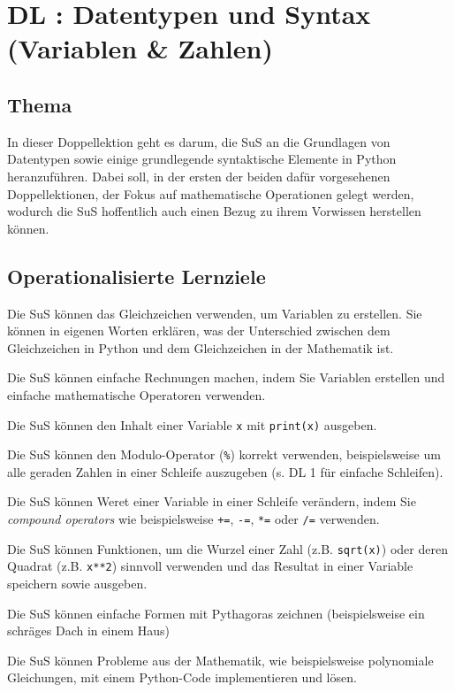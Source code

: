\section{DL \themycounter: Datentypen und Syntax (Variablen \& Zahlen)}
\begin{myExBox}[title=DL \themycounter]
\subsection*{Thema}
In dieser Doppellektion geht es darum, die SuS an die Grundlagen von Datentypen sowie einige grundlegende syntaktische Elemente in Python heranzuführen. Dabei soll, in der ersten der beiden dafür vorgesehenen Doppellektionen, der Fokus auf mathematische Operationen gelegt werden, wodurch die SuS hoffentlich auch einen Bezug zu ihrem Vorwissen herstellen können.

\subsection*{Operationalisierte Lernziele}
\begin{todolist}
    \item Die SuS können das Gleichzeichen verwenden, um Variablen zu erstellen. Sie können in eigenen Worten erklären, was der Unterschied zwischen dem Gleichzeichen in Python und dem Gleichzeichen in der Mathematik ist.
    \item Die SuS können einfache Rechnungen machen, indem Sie Variablen erstellen und einfache mathematische Operatoren verwenden.
    \item Die SuS können den Inhalt einer Variable \lstinline|x| mit \lstinline|print(x)| ausgeben.
    \item Die SuS können den Modulo-Operator (\lstinline|%|) korrekt verwenden, beispielsweise um alle geraden Zahlen in einer Schleife auszugeben  (s. DL 1 für einfache Schleifen).
    \item Die SuS können Weret einer Variable in einer Schleife verändern, indem Sie \textit{compound operators} wie beispielsweise \lstinline|+=|, \lstinline|-=|, \lstinline|*=| oder \lstinline|/=| verwenden.
    \item Die SuS können Funktionen, um die Wurzel einer Zahl (z.B. \lstinline|sqrt(x)|) oder deren Quadrat (z.B. \lstinline|x**2|) sinnvoll verwenden und das Resultat in einer Variable speichern sowie ausgeben.
    \item Die SuS können einfache Formen mit Pythagoras zeichnen (beispielsweise ein schräges Dach in einem Haus)
    \item Die SuS können Probleme aus der Mathematik, wie beispielsweise polynomiale Gleichungen, mit einem Python-Code implementieren und lösen.
\end{todolist}


\end{myExBox}
